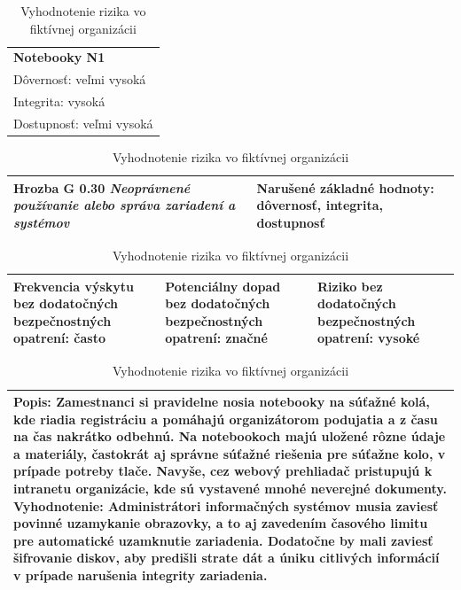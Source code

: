 \begin{table}[!h]

\begin{tabularx}{\textwidth}{|X|}
\hline
\rowcolor{headerblue}
\textbf{Notebooky N1} \\
\rowcolor{headerblue}
Dôvernosť: veľmi vysoká \\
\rowcolor{headerblue}
Integrita: vysoká \\
\rowcolor{headerblue}
Dostupnosť: veľmi vysoká \\
\hline
\end{tabularx}

\begin{tabularx}{\textwidth}{|X|X|}
\hline
Hrozba \newline
G 0.30 \textit{Neoprávnené používanie alebo správa zariadení a systémov}
&
Narušené základné hodnoty: \newline
dôvernosť, integrita, dostupnosť \\
\hline
\end{tabularx}

\begin{tabularx}{\textwidth}{|X|X|X|}
\hline
Frekvencia výskytu bez dodatočných bezpečnostných opatrení: často
&
Potenciálny dopad bez dodatočných bezpečnostných opatrení: značné
&
\rowcolor{riskyellow}
Riziko bez dodatočných bezpečnostných opatrení: vysoké \\
\hline
\end{tabularx}

\begin{tabularx}{\textwidth}{|X|}
\hline
\textbf{Popis:} \newline
Zamestnanci si pravidelne nosia notebooky na súťažné kolá, kde riadia registráciu a pomáhajú organizátorom podujatia a
z času na čas nakrátko odbehnú. Na notebookoch majú uložené rôzne údaje a materiály, častokrát aj správne súťažné
riešenia pre súťažne kolo, v prípade potreby tlače. Navyše, cez webový prehliadač pristupujú k intranetu organizácie,
kde sú vystavené mnohé neverejné dokumenty.
\newline
\textbf{Vyhodnotenie:} \newline
Administrátori informačných systémov musia zaviesť povinné uzamykanie obrazovky, a to aj zavedením časového limitu pre automatické uzamknutie
zariadenia. Dodatočne by mali zaviesť šifrovanie diskov, aby predišli strate dát a úniku citlivých informácií v prípade narušenia integrity
zariadenia.
\\
\hline
\end{tabularx}
\caption{Vyhodnotenie rizika vo fiktívnej organizácii}
\label{tbl:riskassesmentexample}
\end{table}